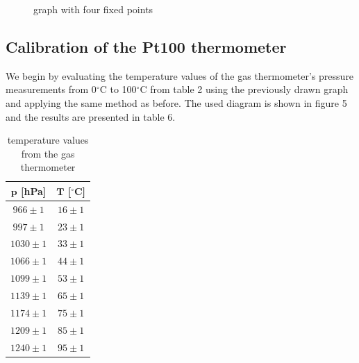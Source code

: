 \documentclass{article}
\begin{document}
\begin{figure} [!p]
    \centering
    \caption{graph with four fixed points}
\end{figure}


\newpage

\subsection{Calibration of the Pt100 thermometer}

We begin by evaluating the temperature values of the gas thermometer's pressure measurements from 0$^{\circ}$C to 100$^{\circ}$C from table 2 using the previously drawn graph and applying the same method as before. The used diagram is shown in figure 5 and the results are presented in table 6.

\begin{table}[!ht]
    \centering
    \begin{tabular}{c|c}
    $\bm{p}$ [hPa] & $\bm{T}$ [$^{\circ}$C] \\ \hline
    $966 \pm 1$  & $16 \pm 1$ \\
    $997 \pm 1$  & $23 \pm 1$ \\
    $1030 \pm 1$  & $33 \pm 1$ \\
    $1066 \pm 1$  & $44 \pm 1$ \\
    $1099 \pm 1$  & $53 \pm 1$ \\
    $1139 \pm 1$  & $65 \pm 1$ \\
    $1174 \pm 1$  & $75 \pm 1$ \\
    $1209 \pm 1$  & $85 \pm 1$ \\
    $1240 \pm 1$  & $95 \pm 1$ \\
    \end{tabular}
    \caption{temperature values from the gas thermometer}
\end{table}
\end{document}
